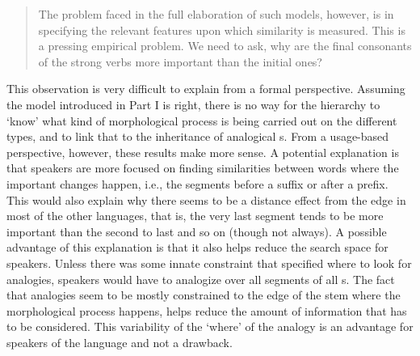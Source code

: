 \begin{quotation}
  The problem faced in the full elaboration of such models, however, is in specifying the relevant features upon which similarity is measured. This is a pressing empirical problem. We need to ask, why are the final consonants of the strong verbs more important than the initial ones? \autocite[62]{Bybee.2010}
\end{quotation}

\noindent
This observation is very difficult to explain from a formal perspective. Assuming the model introduced in Part I is right, there is no way for the hierarchy to `know' what kind of morphological process is being carried out on the different types, and to link that to the inheritance of analogical s. From a usage-based perspective, however, these results make more sense. A potential explanation is that speakers are more focused on finding similarities between words where the important changes happen, i.e., the segments before a suffix or after a prefix. This would also explain why there seems to be a distance effect from the edge in most of the other languages, that is, the very last segment tends to be more important than the second to last and so on (though not always). A possible advantage of this explanation is that it also helps reduce the search space for speakers. Unless there was some innate constraint that specified where to look for analogies, speakers would have to analogize over all segments of all s. The fact that analogies seem to be mostly constrained to the edge of the stem where the morphological process happens, helps reduce the amount of information that has to be considered. This variability of the `where' of the analogy is an advantage for speakers of the language and not a drawback.

